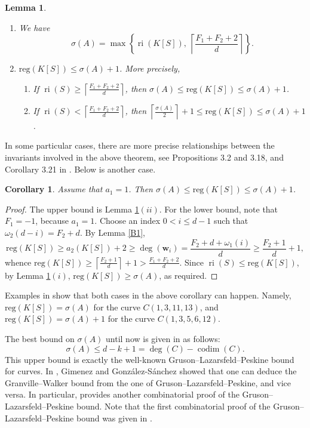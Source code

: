 \documentclass[11pt]{article}
\newtheorem{Lemma}[Theorem]{Lemma}
\newtheorem{Corollary}[Theorem]{Corollary}
\def\deg{\operatorname{deg}}
\def\codim{\operatorname{codim}}
\def\reg{\mathrm{reg}}
\def\ri{\operatorname{ri}}
\def\wbf{{\mathbf w}}
\theoremstyle{remark}
\theoremstyle{definition}
\begin{document}
 \begin{Lemma}\label{GSTh31}
 \begin{enumerate}[\((i)\)]
     \item {\rm \cite[Theorem 3.1]{GS}} We have
$$\sigma (A) = \max\left\{ \ri (K[S]),\ \left\lceil \frac{F_1 + F_2 + 2}{d} \right\rceil \right\}.$$
\item {\rm \cite[Theorem 3.16]{GS}} $\reg(K[S]) \leq \sigma(A)+1$. More precisely,
\begin{enumerate}[\((a)\)]
    \item If $\ri(S) \geq \left\lceil \frac{F_1 + F_2 + 2}{d} \right\rceil$, then $\sigma(A) \leq \reg(K[S]) \leq \sigma(A)+1$.
    \item If $\ri(S) < \left\lceil \frac{F_1 + F_2 + 2}{d} \right\rceil$, 
 then $\left\lceil \frac{\sigma(A)  }{2} \right\rceil + 1 \leq \reg(K[S]) \leq \sigma(A)+1$.
\end{enumerate}
 \end{enumerate}
\end{Lemma}
 
 In some particular cases, there are  more precise relationships between the invariants involved in the above theorem, see Propositions 3.2 and 3.18, and Corollary 3.21 in \cite{GS}. Below is another case.
 
 \begin{Corollary} \label{GSCor}  Assume that $a_1 = 1$. Then $\sigma(A) \leq \reg(K[S]) \leq \sigma(A)+1$.
\end{Corollary}
 
 \begin{proof} The upper bound is Lemma \ref{GSTh31}\((ii)\). For the lower bound, note that $F_1 = -1$, because   $a_1= 1$. Choose an index $0< i\leq d-1$ such that $\omega_2(d-i) = F_2 + d$. By Lemma \ref{B1}, 
 $$\reg(K[S]) \geq a_2(K[S]) + 2 \geq \deg(\wbf_i) = \frac{F_2+d + \omega_1(i)}{d} \geq \frac {F_2+1}{d} + 1,$$
 whence
 $\reg(K[S]) \geq \left\lceil \frac{F_2+1}{d} \right\rceil +1 > 
 \frac{F_1+F_2 +2}{d}$. Since $\ri(S) \leq \reg(K[S])$, by Lemma \ref{GSTh31}\((i)\), $\reg(K[S]) \geq \sigma(A)$, as required.
\end{proof}
Examples in \cite[Table 1]{GS} show that both cases in the above corollary can happen. Namely, $\reg(K[S]) = \sigma(A)$ for the curve $C(1,3,11,13)$, and $\reg(K[S]) = \sigma(A) +1$ for the curve $C(1,3,5,6,12)$.

 The best bound on $\sigma(A)$ until now  is given in \cite[Theorem 1]{GW} as follows:
 $$\sigma (A) \leq  d - k +1 = \deg(C) - \codim (C).$$
 This upper bound is exactly the well-known Gruson--Lazarsfeld--Peskine bound for curves. In \cite[Section 5]{GS}, Gimenez and Gonz\'alez-S\'anchez showed that one can deduce the Granville--Walker bound from the one of Gruson--Lazarsfeld--Peskine, and vice versa. In particular,  \cite[Theorem 3.1]{GS} provides another combinatorial proof of the Gruson--Lazarsfeld--Peskine bound. Note that the first combinatorial proof of the Gruson--Lazarsfeld--Peskine bound was given in \cite{Nit}.
 
\end{document}
